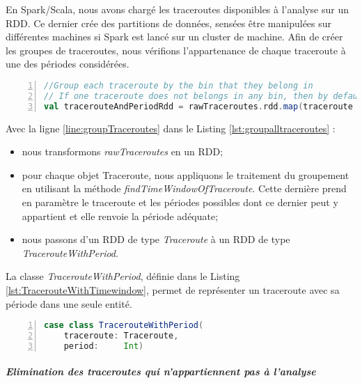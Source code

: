 En Spark/Scala, nous avons chargé les traceroutes disponibles à l'analyse sur un RDD. Ce dernier crée des partitions de données, sensées être manipulées sur différentes machines si Spark est lancé sur un cluster de machine. Afin de créer les groupes de traceroutes, nous vérifions l'appartenance de chaque traceroute à une des périodes considérées.

\begin{lstlisting}[language=scala,firstnumber=1, caption={},label={lst:groupalltraceroutes}, basicstyle = \small,escapechar=|,numbers=left,
stepnumber=1]
//Group each traceroute by the bin that they belong in 
// If one traceroute does not belongs in any bin, then by default it belongs to the bin 0
val tracerouteAndPeriodRdd = rawTraceroutes.rdd.map(traceroute => TracerouteWithTimewindow(traceroute, findTimeWindowOfTraceroute(traceroute, rangeDatesTimewindows)))|\label{line:groupTraceroutes}|
\end{lstlisting}

Avec la ligne \ref{line:groupTraceroutes} dans le Listing \ref{lst:groupalltraceroutes} :

\begin{itemize}
	\item nous transformons  \textit{rawTraceroutes}  en un RDD;
	\item pour chaque objet Traceroute, nous appliquons le traitement du groupement en utilisant la méthode \textit{findTimeWindowOfTraceroute}. Cette dernière prend en paramètre le traceroute et les périodes possibles dont ce dernier peut y appartient et elle renvoie la période adéquate;
	\item nous passons d'un RDD de type \textit{Traceroute} à un RDD de type \textit{TracerouteWithPeriod}.
\end{itemize}

La  classe \textit{TracerouteWithPeriod}, définie dans le Listing \ref{lst:TracerouteWithTimewindow}, permet de représenter un traceroute avec sa période dans une seule entité. 
\begin{lstlisting}[language=scala,firstnumber=1, caption={Définition de la classe TracerouteWithPeriod },label={lst:TracerouteWithTimewindow}, basicstyle = \footnotesize,escapechar=|,numbers=left,
stepnumber=1]
case class TracerouteWithPeriod(
	traceroute: Traceroute,
	period:     Int)
\end{lstlisting}

\subparagraph{Elimination des traceroutes qui n'appartiennent pas à l'analyse}~

